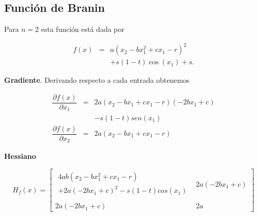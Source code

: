 \documentclass[11pt,letterpaper]{article}
\theoremstyle{definition}
\theoremstyle{definition}
\theoremstyle{definition}
\begin{document}
\subsection{Función de Branin}
Para $ n = 2 $ esta función está dada por
\begin{shaded*}
	\begin{eqnarray*}
		f(x) & = & a(x_2 - b x_1^2 + cx_1 - r)^2 \\
			 &   & + s(1-t) \cos(x_1) +s.
	\end{eqnarray*}
\end{shaded*}
\textbf{Gradiente}. Derivando respecto a cada entrada obtenemos
\begin{shaded*}
	\begin{eqnarray*}
		\dfrac{\partial f(x)}{\partial x_1} & = & 2a(x_2 - bx_1 +cx_1-r)(-2bx_1+c)  \\
											&   & -s(1-t) sen(x_1) \\
		\dfrac{\partial f(x)}{\partial x_2} & = & 2a(x_2 -bx_1 + cx_1 -r) 
	\end{eqnarray*}
\end{shaded*}
\textbf{Hessiano}
\begin{shaded*}
	\scriptsize{\begin{equation*}
			H_f (x) = \left[\begin{matrix}
				\begin{matrix}
					4ab(x_2 -bx_1^2 +cx_1-r) \\
					+ 2a(-2bx_1 +c)^2 - s(1-t)cos(x_1) \\
					
				\end{matrix}  & 2a(-2bx_1 +c) \\
				2a(-2bx_1 +c)            & 2a			
			\end{matrix}\right]
	\end{equation*}}
\end{shaded*}
\end{document}
